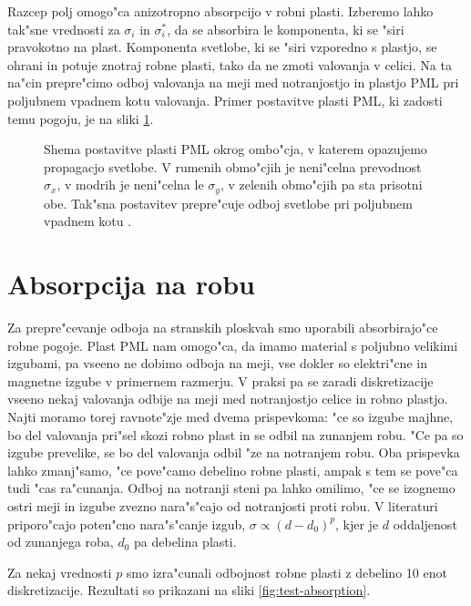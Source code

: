 \documentclass[12pt,twoside,openright,final,a4paper]{report}
\begin{document}
Razcep polj omogo"ca anizotropno absorpcijo v robni plasti. 
Izberemo lahko tak"sne vrednosti za $\sigma_i$ in $\sigma^\ast_i$, da se absorbira le komponenta, ki se "siri pravokotno na plast. 
Komponenta svetlobe, ki se "siri vzporedno s plastjo, se ohrani in potuje znotraj robne plasti, tako da ne zmoti valovanja v celici. 
Na ta na"cin prepre"cimo odboj valovanja na meji med notranjostjo in plastjo \acs{PML} pri poljubnem vpadnem kotu valovanja. 
Primer postavitve plasti \acs{PML}, ki zadosti temu pogoju, je na sliki \ref{fig:pml-shema}. 

\begin{figure}[!htbp]
 \centering
 \def\svgwidth{.4\textwidth}
 
 \caption{Shema postavitve plasti \acs{PML} okrog ombo"cja, v katerem opazujemo propagacjo svetlobe. V rumenih obmo"cjih je neni"celna prevodnost $\sigma_x$, v modrih je neni"celna le $\sigma_y$, v zelenih obmo"cjih pa sta prisotni obe. Tak"sna postavitev prepre"cuje odboj svetlobe pri poljubnem vpadnem kotu \cite{taflove}. }
 \label{fig:pml-shema}
\end{figure}

\section{Absorpcija na robu}
Za prepre"cevanje odboja na stranskih ploskvah smo uporabili absorbirajo"ce robne pogoje. 
Plast \acs{PML} nam omogo"ca, da imamo material s poljubno velikimi izgubami, pa vseeno ne dobimo odboja na meji, vse dokler so elektri"cne in magnetne izgube v primernem razmerju. 
V praksi pa se zaradi diskretizacije vseeno nekaj valovanja odbije na meji med notranjostjo celice in robno plastjo. 
Najti moramo torej ravnote"zje med dvema prispevkoma: "ce so izgube majhne, bo del valovanja pri"sel skozi robno plast in se odbil na zunanjem robu. 
"Ce pa so izgube prevelike, se bo del valovanja odbil "ze na notranjem robu. 
Oba prispevka lahko zmanj"samo, "ce pove"camo debelino robne plasti, ampak s tem se pove"ca tudi "cas ra"cunanja. 
Odboj na notranji steni pa lahko omilimo, "ce se izognemo ostri meji in izgube zvezno nara"s"cajo od notranjosti proti robu. 
V literaturi \cite{taflove} priporo"cajo poten"cno nara"s"canje izgub, $\sigma \propto (d-d_0)^{p}$, kjer je $d$ oddaljenost od zunanjega roba, $d_0$ pa debelina plasti. 

Za nekaj vrednosti $p$ smo izra"cunali odbojnost robne plasti z debelino 10 enot diskretizacije. 
Rezultati so prikazani na sliki \ref{fig:test-absorption}. 
\end{document}
